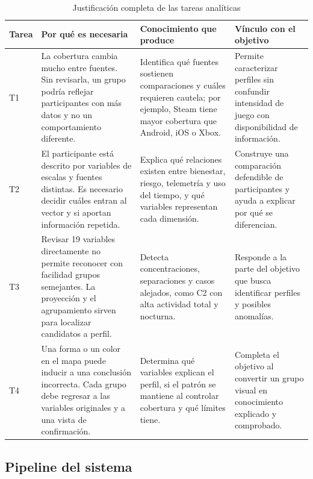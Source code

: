 \documentclass[12pt,a4paper]{article}
\begin{document}
\begin{table}[H]
\centering
\caption{Justificaci\'on completa de las tareas anal\'iticas}
\footnotesize
\renewcommand{\arraystretch}{1.18}
\begin{tabularx}{\textwidth}{p{0.7cm} p{3.25cm} p{3.8cm} X}
\toprule
\textbf{Tarea} & \textbf{Por qu\'e es necesaria} & \textbf{Conocimiento que produce} & \textbf{V\'inculo con el objetivo} \\
\midrule
T1 & La cobertura cambia mucho entre fuentes. Sin revisarla, un grupo podr\'ia reflejar participantes con m\'as datos y no un comportamiento diferente. & Identifica qu\'e fuentes sostienen comparaciones y cu\'ales requieren cautela; por ejemplo, Steam tiene mayor cobertura que Android, iOS o Xbox. & Permite caracterizar perfiles sin confundir intensidad de juego con disponibilidad de informaci\'on. \\
T2 & El participante est\'a descrito por variables de escalas y fuentes distintas. Es necesario decidir cu\'ales entran al vector y si aportan informaci\'on repetida. & Explica qu\'e relaciones existen entre bienestar, riesgo, telemetr\'ia y uso del tiempo, y qu\'e variables representan cada dimensi\'on. & Construye una comparaci\'on defendible de participantes y ayuda a explicar por qu\'e se diferencian. \\
T3 & Revisar 19 variables directamente no permite reconocer con facilidad grupos semejantes. La proyecci\'on y el agrupamiento sirven para localizar candidatos a perfil. & Detecta concentraciones, separaciones y casos alejados, como C2 con alta actividad total y nocturna. & Responde a la parte del objetivo que busca identificar perfiles y posibles anomal\'ias. \\
T4 & Una forma o un color en el mapa puede inducir a una conclusi\'on incorrecta. Cada grupo debe regresar a las variables originales y a una vista de confirmaci\'on. & Determina qu\'e variables explican el perfil, si el patr\'on se mantiene al controlar cobertura y qu\'e l\'imites tiene. & Completa el objetivo al convertir un grupo visual en conocimiento explicado y comprobado. \\
\bottomrule
\end{tabularx}
\renewcommand{\arraystretch}{1}
\end{table}

\subsection{Pipeline del sistema}
\end{document}
